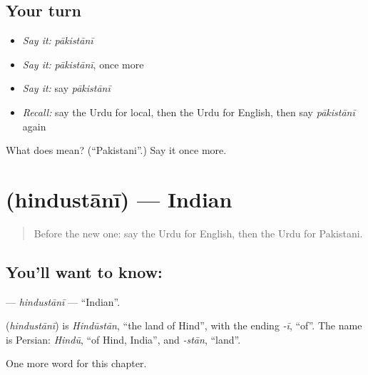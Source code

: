 \subsection*{Your turn}
\begin{itemize}
\raggedright
  \item \emph{Say it:} \emph{pākistānī}
  \item \emph{Say it:} \emph{pākistānī}, once more
  \item \emph{Say it:} say \emph{pākistānī}
  \item \emph{Recall:} say the Urdu for local, then the Urdu for English, then say \emph{pākistānī} again
\end{itemize}

\begin{tcolorbox}[breakable,colback=teal!4,colframe=teal!35!black,title={Before you move on}]
What does  mean? (\textquotedblleft{}Pakistani\textquotedblright{}.) Say it once more.
\end{tcolorbox}
\section[\texorpdfstring{\ur{ہندوستانی} (hindustānī)}{ہندوستانی (hindustānī)}]{ (hindustānī) — Indian}

\label{lesson:UR-C162-hindustani}



\begin{quote}
Before the new one: say the Urdu for English, then the Urdu for Pakistani.
\end{quote}

\subsection*{You'll want to know: }
\textbf{} — \emph{hindustānī} — \textquotedblleft{}Indian\textquotedblright{}.

\begin{cousinweb}
\textbf{} (\emph{hindustānī}) is \emph{Hindūstān}, \textquotedblleft{}the land of Hind\textquotedblright{}, with the ending \emph{-ī}, \textquotedblleft{}of\textquotedblright{}. The name is Persian: \emph{Hindū}, \textquotedblleft{}of Hind, India\textquotedblright{}, and \emph{-stān}, \textquotedblleft{}land\textquotedblright{}.
\end{cousinweb}

\begin{grammarlens}[title={What you've built}]
One more word for this chapter.
\end{grammarlens}

